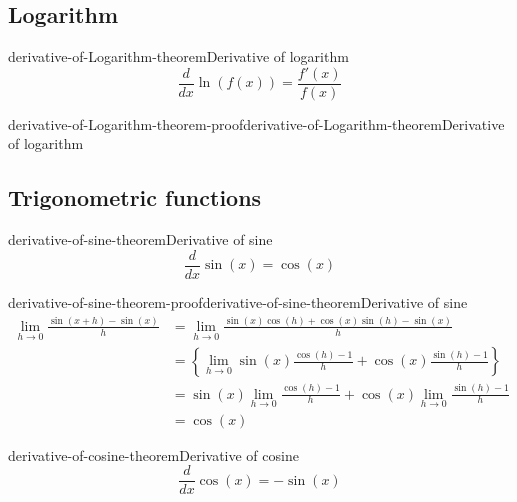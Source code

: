 \documentclass[preview]{standalone}
\begin{document}
\subsection{Logarithm}

\begin{snippettheorem}{derivative-of-Logarithm-theorem}{Derivative of logarithm}
    \todo %
    \[
        \frac{d}{dx} \ln(f(x)) = \frac{f'(x)}{f(x)}
    \]
\end{snippettheorem}

\begin{snippetproof}{derivative-of-Logarithm-theorem-proof}{derivative-of-Logarithm-theorem}{Derivative of logarithm}
    \todo %
\end{snippetproof}

\subsection{Trigonometric functions}

\begin{snippettheorem}{derivative-of-sine-theorem}{Derivative of sine}
    \[
        \frac{d}{dx} \sin(x) = \cos(x)
    \]
\end{snippettheorem}

\begin{snippetproof}{derivative-of-sine-theorem-proof}{derivative-of-sine-theorem}{Derivative of sine}
    \begin{align*}
        \lim_{h\to 0} \frac{\sin(x+h) - \sin(x)}{h} &=
        \lim_{h\to 0} \frac{\sin(x)\cos(h) + \cos(x)\sin(h) - \sin(x)}{h} \\
        &= \left\{\lim_{h\to 0} \sin(x) \frac{\cos(h) - 1}{h} + \cos(x) \frac{\sin(h) - 1}{h}\right\} \\
        &= \sin(x) \lim_{h\to 0} \frac{\cos(h) - 1}{h} + \cos(x) \lim_{h\to 0} \frac{\sin(h) - 1}{h} \\
        &= \cos(x)
    \end{align*}
\end{snippetproof}

\begin{snippettheorem}{derivative-of-cosine-theorem}{Derivative of cosine}
    \[
        \frac{d}{dx} \cos(x) = -\sin(x)
    \]
\end{snippettheorem}
\end{document}
